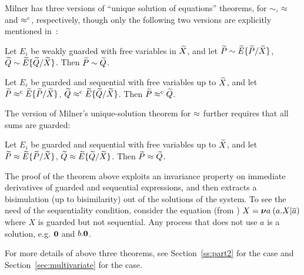 Milner has  three versions of  ``unique solution of equations''
theorems, for $\sim$, $\approx$ and $\mathrel{\approx^{\rm{c}}}$, respectively, though only the
following two versions are explicitly mentioned in~\citep[p.~103, 158]{Mil89}:
\begin{theorem}
\label{t:Mil89s1}
Let $E_i$ be weakly guarded with free variables in $\widetilde X$,
and let ${\widetilde P} \sim {\widetilde E}\{\widetilde P /\widetilde X\}$,
  ${\widetilde Q} \sim {\widetilde E}\{\widetilde Q /\widetilde X\}$. Then ${\widetilde P} \sim {\widetilde Q}$.
\end{theorem}

\begin{theorem}
\label{t:Mil89s3}
Let $E_i$ be guarded and sequential with free
variables up to $\widetilde X$, and let ${\widetilde P} \mathrel{\approx^{\rm{c}}} {\widetilde E}\{\widetilde P /\widetilde X\}$,
  ${\widetilde Q} \mathrel{\approx^{\rm{c}}} {\widetilde E}\{\widetilde Q /\widetilde X\}$. Then ${\widetilde P} \mathrel{\approx^{\rm{c}}} {\widetilde Q}$.
\end{theorem}

The version of Milner's unique-solution theorem for $\approx$ further requires
that all sums are guarded:
\begin{theorem}
\label{t:Mil89}
Let $E_i$ be guarded and sequential with free
variables up to $\widetilde X$, and let ${\widetilde P} \approx {\widetilde E}\{\widetilde P /\widetilde X\}$,
  ${\widetilde Q} \approx {\widetilde E}\{\widetilde Q /\widetilde X\}$. Then ${\widetilde P} \approx {\widetilde Q}$.
\end{theorem}

The proof of the theorem above exploits an invariance
property on immediate derivatives
of guarded and sequential expressions, and then extracts a bisimulation
(up to bisimilarity) out
of the solutions of the system.
To see the need of the sequentiality  condition, consider
 the equation (from \cite{Mil89}) $X = {\boldsymbol \nu} a\: (a. X | \overline{a})$
where $X$ is guarded but not sequential. Any process that does not use
$a$ is a solution, e.g. ${\boldsymbol 0}$ and $b.{\boldsymbol 0}$.

For more details of above three theorems, see Section~\ref{ss:part2}
for the \univariate case and
Section~\ref{sec:multivariate} for the \multivariate case.

